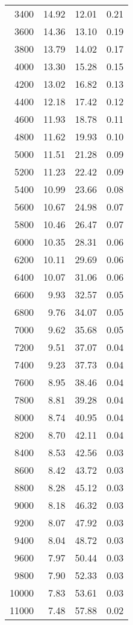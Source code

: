\begin{table}[ht]
\begin{tabular}{rrrr}
   3400 & 14.92 & 12.01 & 0.21 \\ 
   3600 & 14.36 & 13.10 & 0.19 \\ 
   3800 & 13.79 & 14.02 & 0.17 \\ 
   4000 & 13.30 & 15.28 & 0.15 \\ 
   4200 & 13.02 & 16.82 & 0.13 \\ 
   4400 & 12.18 & 17.42 & 0.12 \\ 
   4600 & 11.93 & 18.78 & 0.11 \\ 
   4800 & 11.62 & 19.93 & 0.10 \\ 
   5000 & 11.51 & 21.28 & 0.09 \\ 
   5200 & 11.23 & 22.42 & 0.09 \\ 
   5400 & 10.99 & 23.66 & 0.08 \\ 
   5600 & 10.67 & 24.98 & 0.07 \\ 
   5800 & 10.46 & 26.47 & 0.07 \\ 
   6000 & 10.35 & 28.31 & 0.06 \\ 
   6200 & 10.11 & 29.69 & 0.06 \\ 
   6400 & 10.07 & 31.06 & 0.06 \\ 
   6600 & 9.93 & 32.57 & 0.05 \\ 
   6800 & 9.76 & 34.07 & 0.05 \\ 
   7000 & 9.62 & 35.68 & 0.05 \\ 
   7200 & 9.51 & 37.07 & 0.04 \\ 
   7400 & 9.23 & 37.73 & 0.04 \\ 
   7600 & 8.95 & 38.46 & 0.04 \\ 
   7800 & 8.81 & 39.28 & 0.04 \\ 
   8000 & 8.74 & 40.95 & 0.04 \\ 
   8200 & 8.70 & 42.11 & 0.04 \\ 
   8400 & 8.53 & 42.56 & 0.03 \\ 
   8600 & 8.42 & 43.72 & 0.03 \\ 
   8800 & 8.28 & 45.12 & 0.03 \\ 
   9000 & 8.18 & 46.32 & 0.03 \\ 
   9200 & 8.07 & 47.92 & 0.03 \\ 
   9400 & 8.04 & 48.72 & 0.03 \\ 
   9600 & 7.97 & 50.44 & 0.03 \\ 
   9800 & 7.90 & 52.33 & 0.03 \\ 
  10000 & 7.83 & 53.61 & 0.03 \\ 
  11000 & 7.48 & 57.88 & 0.02 \\ 

\end{tabular}
\end{table}
